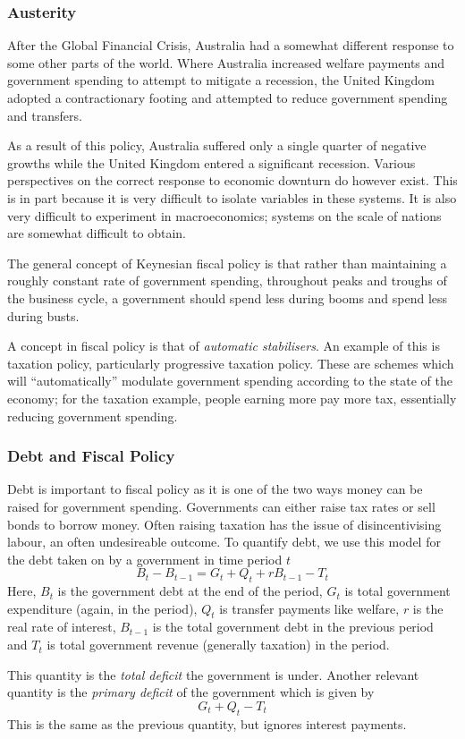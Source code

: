 \documentclass[12pt]{report}
\begin{document}
\begin{flushleft}
\subsubsection*{Austerity}

After the Global Financial Crisis, Australia had a somewhat different response
to some other parts of the world. Where Australia increased welfare payments
and government spending to attempt to mitigate a recession, the United Kingdom
adopted a contractionary footing and attempted to reduce government spending
and transfers. \par
As a result of this policy, Australia suffered only a single quarter of
negative growths while the United Kingdom entered a significant recession.
Various perspectives on the correct response to economic downturn do however
exist. This is in part because it is very difficult to isolate variables in
these systems. It is also very difficult to experiment in macroeconomics;
systems on the scale of nations are somewhat difficult to obtain. \par
The general concept of Keynesian fiscal policy is that rather than maintaining
a roughly constant rate of government spending, throughout peaks and troughs
of the business cycle, a government should spend less during booms and spend
less during busts. \par
A concept in fiscal policy is that of \textit{automatic stabilisers}. An
example of this is taxation policy, particularly progressive taxation policy.
These are schemes which will ``automatically'' modulate government spending
according to the state of the economy; for the taxation example, people earning
more pay more tax, essentially reducing government spending.

\subsubsection*{Debt and Fiscal Policy}

Debt is important to fiscal policy as it is one of the two ways money can be 
raised for government spending. Governments can either raise tax rates or sell
bonds to borrow money. Often raising taxation has the issue of disincentivising
labour, an often undesireable outcome. To quantify debt, we use this model
for the debt taken on by a government in time period \(t\)
\[B_t - B_{t - 1} = G_t + Q_t + rB_{t - 1} - T_t\] 
Here, \(B_t\) is the government debt at the end of the period, \(G_t\) is total
government expenditure (again, in the period), \(Q_t\) is transfer payments
like welfare, \(r\) is the real rate of interest, \(B_{t - 1}\) is the total
government debt in the previous period and \(T_t\) is total government revenue
(generally taxation) in the period. \par
This quantity is the \textit{total deficit} the government is under. Another
relevant quantity is the \textit{primary deficit} of the government which is
given by
\[G_t + Q_t - T_t\]
This is the same as the previous quantity, but ignores interest payments.


\end{flushleft}
\end{document}
